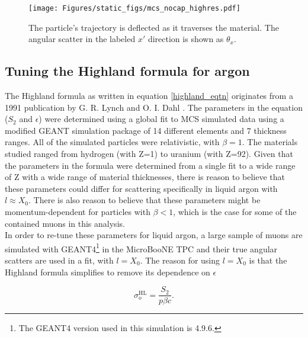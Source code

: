 \documentclass[a4paper,11pt]{article}
\begin{document}
\begin{figure}[ht!]
\centering
	\texttt{[image: Figures/static\_figs/mcs\_nocap\_highres.pdf]} \\
\caption{The particle's trajectory is deflected as it traverses the material. The angular scatter in the labeled $x'$ direction is shown as $\theta_x$.}\label{mcs_nocap_fig}
\end{figure}












\subsection{Tuning the Highland formula for argon}\label{highland_tuning_section}

The Highland formula as written in equation \ref{highland_eqtn} originates from a 1991 publication by G. R. Lynch and O. I. Dahl \cite{highland-lynch-dahl}. The parameters in the equation ($S_2$ and $\epsilon$) were determined using a global fit to MCS simulated data using a modified GEANT simulation package of 14 different elements and 7 thickness ranges. All of the simulated particles were relativistic, with $\beta=1$. The materials studied ranged from hydrogen (with Z=1) to uranium (with Z=92). Given that the parameters in the formula were determined from a single fit to a wide range of Z with a wide range of material thicknesses, there is reason to believe that these parameters could differ for scattering specifically in liquid argon with $l \approx X_0$. There is also reason to believe that these parameters might be momentum-dependent for particles with $\beta < 1$, which is the case for some of the contained muons in this analysis.\\

In order to re-tune these parameters for liquid argon, a large sample of muons are simulated with GEANT4\footnote{The GEANT4 version used in this simulation is 4.9.6.} \cite{GEANT4_citation} in the MicroBooNE TPC and their true angular scatters are used in a fit, with $l = X_0$. The reason for using $l = X_0$ is that the Highland formula simplifies to remove its dependence on $\epsilon$

\begin{equation}\label{highland_simplified}
	\sigma_o^{\text{HL}}=\frac{S_2}{p\beta c}.
\end{equation}
\end{document}
